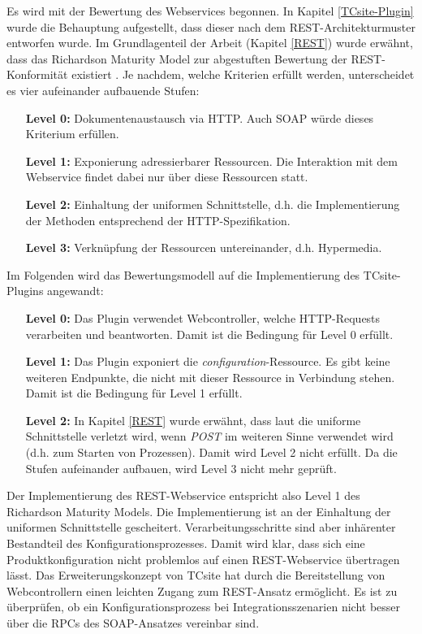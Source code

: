 \documentclass[11pt, a4paper, titlepage, listof=totoc, bibliography=totoc, index=totoc, twoside, openright, headings=normal, draft]{scrreprt}
\begin{document}
Es wird mit der Bewertung des Webservices begonnen. In Kapitel \ref{TCsite-Plugin} wurde die Behauptung aufgestellt, dass dieser nach dem REST-Architekturmuster entworfen wurde. Im Grundlagenteil der Arbeit (Kapitel \ref{REST}) wurde erwähnt, dass das \glqq Richardson Maturity Model\grqq{} zur abgestuften Bewertung der REST-Konformität existiert \citep{wilde11}. Je nachdem, welche Kriterien erfüllt werden, unterscheidet es vier aufeinander aufbauende Stufen:
\begin{enumerate}
\item[\textbf{Level 0:}] Dokumentenaustausch via HTTP. Auch SOAP würde dieses Kriterium erfüllen.
\item[\textbf{Level 1:}] Exponierung adressierbarer Ressourcen. Die Interaktion mit dem Webservice findet dabei nur über diese Ressourcen statt.
\item[\textbf{Level 2:}] Einhaltung der uniformen Schnittstelle, d.h. die Implementierung der Methoden entsprechend der HTTP-Spezifikation.
\item[\textbf{Level 3:}] Verknüpfung der Ressourcen untereinander, d.h. Hypermedia.
\end{enumerate}

Im Folgenden wird das Bewertungsmodell auf die Implementierung des TCsite-Plugins angewandt:
\begin{enumerate}
\item[\textbf{Level 0:}] Das Plugin verwendet Webcontroller, welche HTTP-Requests verarbeiten und beantworten. Damit ist die Bedingung für Level 0 erfüllt.
\item[\textbf{Level 1:}] Das Plugin exponiert die \emph{configuration}-Ressource. Es gibt keine weiteren Endpunkte, die nicht mit dieser Ressource in Verbindung stehen. Damit ist die Bedingung für Level 1 erfüllt.
\item[\textbf{Level 2:}] In Kapitel \ref{REST} wurde erwähnt, dass laut \citet{richardson07} die uniforme Schnittstelle verletzt wird, wenn \emph{POST} im weiteren Sinne verwendet wird (d.h. zum Starten von Prozessen). Damit wird Level 2 nicht erfüllt. Da die Stufen aufeinander aufbauen, wird Level 3 nicht mehr geprüft.
\end{enumerate}

Der Implementierung des REST-Webservice entspricht also Level 1 des \glqq Richardson Maturity Models\grqq{}. Die Implementierung ist an der Einhaltung der uniformen Schnittstelle gescheitert. Verarbeitungsschritte sind aber inhärenter Bestandteil des Konfigurationsprozesses. Damit wird klar, dass sich eine Produktkonfiguration nicht problemlos auf einen REST-Webservice übertragen lässt. Das Erweiterungskonzept von TCsite hat durch die Bereitstellung von Webcontrollern einen leichten Zugang zum REST-Ansatz ermöglicht. Es ist zu überprüfen, ob ein Konfigurationsprozess bei Integrationsszenarien nicht besser über die RPCs des SOAP-Ansatzes vereinbar sind.
\end{document}
